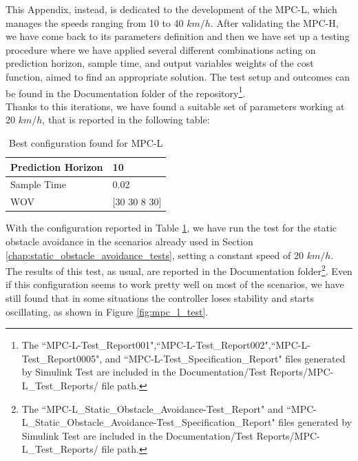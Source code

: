 This Appendix, instead, is dedicated to the development of the MPC-L, which manages the speeds ranging from 10 to 40 $km/h$. After validating the MPC-H, we have come back to its parameters definition and then we have set up a testing procedure where we have applied several different combinations acting on prediction horizon, sample time, and output variables weights of the cost function, aimed to find an appropriate solution.
The test setup and outcomes can be found in the Documentation folder of the repository\footnote{The ``MPC-L-Test\_Report001",\space``MPC-L-Test\_Report002",\space``MPC-L-Test\_Report0005", and ``MPC-L-Test\_Specification\_Report" files generated by Simulink Test are included in the Documentation/Test Reports/MPC-L\_Test\_Reports/ file path.}.\\
Thanks to this iterations, we have found a suitable set of parameters working at 20 $km/h$, that is reported in the following table:
\begin{table}[H]
\centering
\begin{tabular}{|l|l|}
\hline
Prediction Horizon & 10               \\ \hline
Sample Time        & 0.02             \\ \hline
WOV                & {[}30 30 8 30{]} \\ \hline
\end{tabular}
\caption{Best configuration found for MPC-L}
\label{tab:MPC_L_Config}
\end{table}
With the configuration reported in Table \ref{tab:MPC_L_Config}, we have run the test for the static obstacle avoidance in the scenarios already used in Section \ref{chap:static_obstacle_avoidance_tests}, setting a constant speed of 20 $km/h$. The results of this test, as usual, are reported in the Documentation folder\footnote{The ``MPC-L\_Static\_Obstacle\_Avoidance-Test\_Report" and ``MPC-L\_Static\_Obstacle\_Avoidance-Test\_Specification\_Report" files generated by Simulink Test are included in the Documentation/Test Reports/MPC-L\_Test\_Reports/ file path.}.
Even if this configuration seems to work pretty well on most of the scenarios, we have still found that in some situations the controller loses stability and starts oscillating, as shown in Figure \ref{fig:mpc_l_test}.

